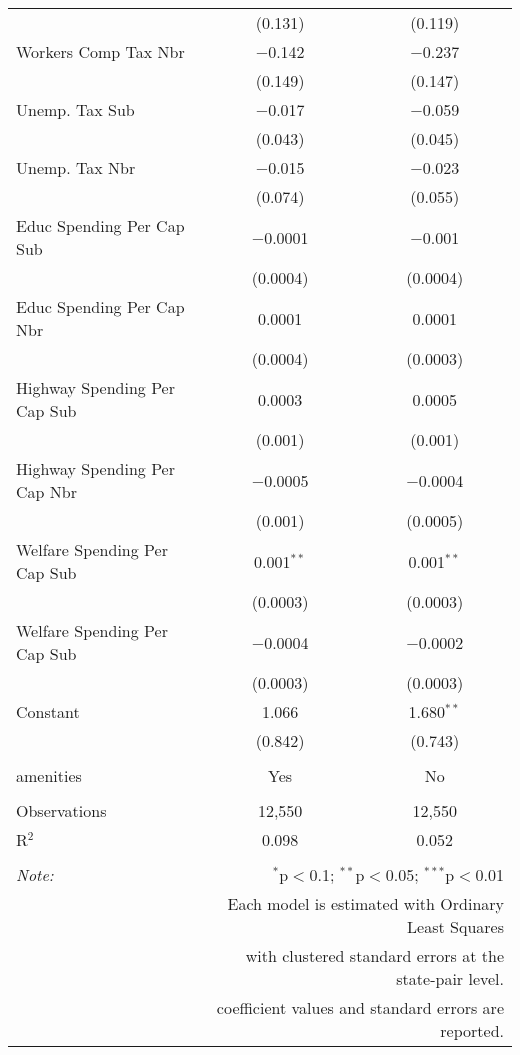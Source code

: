 \begin{table}[!htbp]
\begin{tabular}{@{\extracolsep{5pt}}lcc}
  & (0.131) & (0.119) \\ 
  Workers Comp Tax Nbr & $-$0.142 & $-$0.237 \\ 
  & (0.149) & (0.147) \\ 
  Unemp. Tax Sub & $-$0.017 & $-$0.059 \\ 
  & (0.043) & (0.045) \\ 
  Unemp. Tax Nbr & $-$0.015 & $-$0.023 \\ 
  & (0.074) & (0.055) \\ 
  Educ Spending Per Cap Sub & $-$0.0001 & $-$0.001 \\ 
  & (0.0004) & (0.0004) \\ 
  Educ Spending Per Cap Nbr & 0.0001 & 0.0001 \\ 
  & (0.0004) & (0.0003) \\ 
  Highway Spending Per Cap Sub & 0.0003 & 0.0005 \\ 
  & (0.001) & (0.001) \\ 
  Highway Spending Per Cap Nbr & $-$0.0005 & $-$0.0004 \\ 
  & (0.001) & (0.0005) \\ 
  Welfare Spending Per Cap Sub & 0.001$^{**}$ & 0.001$^{**}$ \\ 
  & (0.0003) & (0.0003) \\ 
  Welfare Spending Per Cap Sub & $-$0.0004 & $-$0.0002 \\ 
  & (0.0003) & (0.0003) \\ 
  Constant & 1.066 & 1.680$^{**}$ \\ 
  & (0.842) & (0.743) \\ 
 \hline \\[-1.8ex] 
amenities & Yes & No \\ 
\hline \\[-1.8ex] 
Observations & 12,550 & 12,550 \\ 
R$^{2}$ & 0.098 & 0.052 \\ 
\hline 
\hline \\[-1.8ex] 
\textit{Note:}  & \multicolumn{2}{r}{$^{*}$p$<$0.1; $^{**}$p$<$0.05; $^{***}$p$<$0.01} \\ 
 & \multicolumn{2}{r}{Each model is estimated with Ordinary Least Squares} \\ 
 & \multicolumn{2}{r}{with clustered standard errors at the state-pair level.} \\ 
 & \multicolumn{2}{r}{coefficient values and standard errors are reported.} \\ 
\end{tabular} 
\end{table} 
